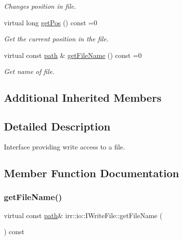 \begin{DoxyCompactItemize}
\begin{DoxyCompactList}\small\item\em Changes position in file. \end{DoxyCompactList}\item 
virtual long \hyperlink{classirr_1_1io_1_1IWriteFile_a062eaf082b6f4d05cf0e44b85aa7a6ab}{get\+Pos} () const =0
\begin{DoxyCompactList}\small\item\em Get the current position in the file. \end{DoxyCompactList}\item 
virtual const \hyperlink{namespaceirr_1_1io_a6468281622ce3a1c46b72e19f32dded5}{path} \& \hyperlink{classirr_1_1io_1_1IWriteFile_ad129ab8feac03f06f2edf685df6a0236}{get\+File\+Name} () const =0
\begin{DoxyCompactList}\small\item\em Get name of file. \end{DoxyCompactList}\end{DoxyCompactItemize}
\subsection*{Additional Inherited Members}


\subsection{Detailed Description}
Interface providing write access to a file. 

\subsection{Member Function Documentation}
\mbox{\label{classirr_1_1io_1_1IWriteFile_ad129ab8feac03f06f2edf685df6a0236}} 
\subsubsection{\texorpdfstring{get\+File\+Name()}{getFileName()}\hspace{0.1cm}{\footnotesize\ttfamily [1/2]}}
{\footnotesize\ttfamily virtual const \hyperlink{namespaceirr_1_1io_a6468281622ce3a1c46b72e19f32dded5}{path}\& irr\+::io\+::\+I\+Write\+File\+::get\+File\+Name (\begin{DoxyParamCaption}{ }\end{DoxyParamCaption}) const\hspace{0.3cm}{\ttfamily [pure virtual]}}



